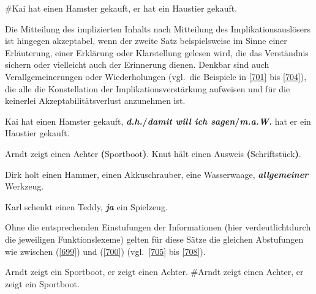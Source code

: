 \begin{exe}
	\ex\label{700} 
	\#Kai hat einen Hamster gekauft, er hat ein Haustier gekauft.	
\end{exe}
Die Mitteilung des implizierten Inhalts nach Mitteilung des Implikationsauslösers ist  hingegen akzeptabel, wenn der zweite Satz beispielsweise im Sinne einer Erläuterung, einer Erklärung oder Klarstellung gelesen wird, die das Verständnis sichern oder vielleicht auch der Erinnerung dienen. Denkbar sind auch Verallgemeinerungen oder Wiederholungen (vgl.\ die Beispiele in \ref{701} bis \ref{704}), die alle die Konstellation der Implikationsverstärkung aufweisen und für die keinerlei Akzeptabilitätsverlust anzunehmen ist.

\begin{exe}
	\ex\label{701} 
	Kai hat einen Hamster gekauft, \textbf{\textit{d.h.}\slash\textit{damit will ich sagen}\slash\textit{m.a.W.}} hat er ein Haustier gekauft.
\end{exe}

\begin{exe}
	\ex\label{702} 
		\begin{xlist}	
			\ex\label{702a} Arndt zeigt einen Achter \textbf{(}Sportboot\textbf{)}.
			\ex\label{702b} Knut hält einen Ausweis \textbf{(}Schriftstück\textbf{)}.
		\end{xlist}
\end{exe}

\begin{exe}
	\ex\label{703} 
	Dirk holt einen Hammer, einen Akkuschrauber, eine Wasserwaage, \textbf{\textit{allgemeiner}} Werkzeug.
\end{exe}

\begin{exe}
	\ex\label{704} 
	Karl schenkt einen Teddy, \textbf{\textit{ja}} ein Spielzeug.
\end{exe}
Ohne die entsprechenden Einstufungen der Informationen (hier verdeutlicht\linebreak durch die jeweiligen Funktionslexeme) gelten für diese Sätze die gleichen Abstufungen wie zwischen (\ref{699}) und (\ref{700}) (vgl.\ \ref{705} bis \ref{708}).

\begin{exe}
	\ex\label{705} 
		\begin{xlist}	
			\ex\label{705a} Arndt zeigt ein Sportboot, er zeigt einen Achter.
			\ex\label{705b} \#Arndt zeigt einen Achter, er zeigt ein Sportboot.
		\end{xlist}
\end{exe}

